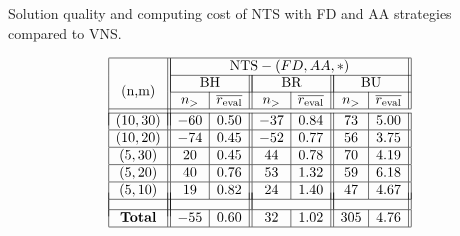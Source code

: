 \documentclass{acm_proc_article-sp}
\begin{document}
\begin{table}
\caption{Solution quality and computing cost of NTS with FD and AA strategies compared to VNS.}
\label{tab:qc}
\vspace{-3ex}
$$
\begin{array}{|c||c|c||c|c||c|c||}
\hline
\multirow{4}{*}{(n,m)} &\multicolumn{6}{|c||}{\textrm{NTS}-(FD,AA,*)} \\
\cline{2-7}
& \multicolumn{2}{|c||}{\textrm{BH}} & \multicolumn{2}{|c||}{\textrm{BR}} & \multicolumn{2}{|c||}{\textrm{BU}} \\ \cline{2-7}


 & n_{>} & \overline{r_{\textrm{eval}}} & n_{>} & \overline{r_{\textrm{eval}}}  & n_{>} & \overline{r_{\textrm{eval}}} \\ 
 \cline{1-7}
 \\[-9 pt] 
\cline{1-7}
(10,30) & -60 & 0.50 & -37 & 0.84 & 73 &  5.00	 \\ \hline
(10,20) & -74 & 0.45 & -52 & 0.77 & 56 & 3.75	\\ \hline	
(5,30) & 20 & 0.45 & 44 & 0.78 & 70 & 4.19	 \\ \hline
(5,20) & 40 & 0.76 & 53 & 1.32 & 59 & 6.18	\\ \hline
(5,10) & 19 & 0.82 & 24 & 1.40  & 47 & 4.67 \\ \hline\\[-17 pt]
& \multicolumn{2}{|c||}{ } & \multicolumn{2}{|c||}{ } & \multicolumn{2}{|c||}{ } \\ \hline
\textrm{\textbf{Total}} & -55 & 0.60 & 32 & 1.02 & 305 & 4.76 \\ \hline
\end{array}
$$
\end{table}
\end{document}
